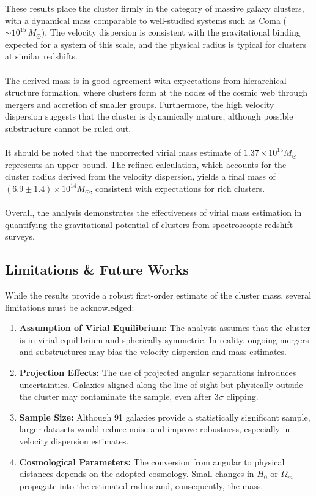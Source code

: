 \documentclass[12pt]{article}
\begin{document}
These results place the cluster firmly in the category of massive galaxy clusters, 
with a dynamical mass comparable to well-studied systems such as Coma 
($\sim 10^{15}\,M_{\odot}$). The velocity dispersion is consistent with the 
gravitational binding expected for a system of this scale, and the physical radius 
is typical for clusters at similar redshifts.\\
\\
The derived mass is in good agreement with expectations from hierarchical structure 
formation, where clusters form at the nodes of the cosmic web through mergers 
and accretion of smaller groups. Furthermore, the high velocity dispersion suggests 
that the cluster is dynamically mature, although possible substructure cannot be ruled out.\\
\\
It should be noted that the uncorrected virial mass estimate of $1.37 \times 10^{15} M_\odot$ 
represents an upper bound. The refined calculation, which accounts for the cluster radius derived 
from the velocity dispersion, yields a final mass of $(6.9 \pm 1.4) \times 10^{14} M_\odot$, 
consistent with expectations for rich clusters.\\
\\
Overall, the analysis demonstrates the effectiveness of virial mass estimation in 
quantifying the gravitational potential of clusters from spectroscopic redshift surveys.
\subsection{Limitations \& Future Works}
While the results provide a robust first-order estimate of the cluster mass, 
several limitations must be acknowledged:

\begin{enumerate}
    \item \textbf{Assumption of Virial Equilibrium:} 
    The analysis assumes that the cluster is in virial equilibrium and spherically symmetric. 
    In reality, ongoing mergers and substructures may bias the velocity dispersion 
    and mass estimates.

    \item \textbf{Projection Effects:} 
    The use of projected angular separations introduces uncertainties. Galaxies 
    aligned along the line of sight but physically outside the cluster may contaminate 
    the sample, even after 3$\sigma$ clipping.

    \item \textbf{Sample Size:} 
    Although 91 galaxies provide a statistically significant sample, 
    larger datasets would reduce noise and improve robustness, especially in 
    velocity dispersion estimates.

    \item \textbf{Cosmological Parameters:} 
    The conversion from angular to physical distances depends on the adopted cosmology. 
    Small changes in $H_0$ or $\Omega_m$ propagate into the estimated radius and, 
    consequently, the mass.
\end{enumerate}
\end{document}
